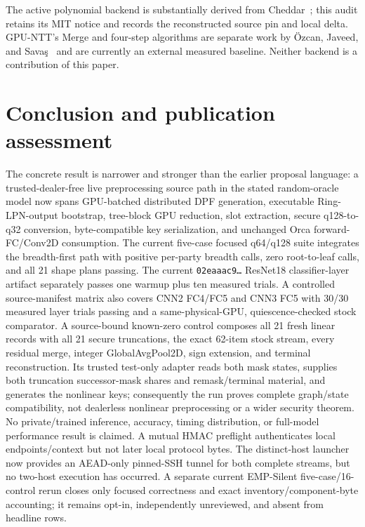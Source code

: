 \documentclass[11pt]{article}
\begin{document}
The active polynomial backend is substantially derived from
Cheddar~\cite{choi2026cheddar}; this audit retains its MIT notice and records
the reconstructed source pin and local delta. GPU-NTT's Merge and four-step
algorithms are separate work by \"Ozcan, Javeed, and
Sava\c{s}~\cite{ozcan2023gpuntt,ozcan2025gpuntt} and are currently an external
measured baseline. Neither backend is a contribution of this paper.

\section{Conclusion and publication assessment}
\label{sec:summary}

The concrete result is narrower and stronger than the earlier proposal
language: a trusted-dealer-free live preprocessing source path in the stated
random-oracle model now spans GPU-batched distributed DPF generation,
executable Ring-LPN-output bootstrap, tree-block GPU reduction, slot extraction,
secure q128-to-q32 conversion, byte-compatible key serialization, and unchanged
Orca forward-FC/Conv2D consumption. The current five-case focused q64/q128 suite
integrates the breadth-first path with positive per-party breadth calls, zero
root-to-leaf calls, and all 21 shape plans passing. The current
\texttt{02eaaac9\ldots} ResNet18 classifier-layer artifact separately passes
one warmup plus ten measured trials. A controlled source-manifest matrix also
covers CNN2 FC4/FC5 and CNN3 FC5 with 30/30 measured layer trials passing and a
same-physical-GPU, quiescence-checked stock comparator.
A source-bound known-zero control composes
all 21 fresh linear records with all 21 secure truncations, the exact 62-item
stock stream, every residual merge, integer GlobalAvgPool2D, sign extension,
and terminal reconstruction. Its trusted test-only adapter reads both mask
states, supplies both truncation successor-mask shares and remask/terminal
material, and generates the nonlinear keys; consequently the run proves
complete graph/state compatibility, not dealerless nonlinear preprocessing or
a wider security theorem. No private/trained inference, accuracy, timing
distribution, or full-model performance result is claimed. A mutual HMAC
preflight authenticates local endpoints/context but not later local protocol
bytes. The distinct-host launcher now provides an AEAD-only pinned-SSH tunnel
for both complete streams, but no two-host execution has occurred. A separate
current EMP-Silent five-case/16-control rerun closes only focused correctness
and exact inventory/component-byte accounting; it remains opt-in,
independently unreviewed, and absent from headline rows.
\end{document}
